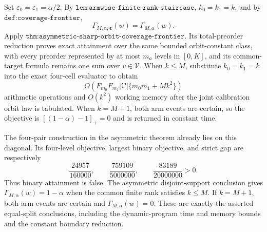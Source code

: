 Set \(\varepsilon_0=\varepsilon_1=\alpha/2\). By \(\texttt{lem:armwise-finite-rank-staircase}\), \(k_0=k_1=k\), and by \(\texttt{def:coverage-frontier}\),
\[
\Gamma_{M,\alpha,\boldsymbol\varepsilon}(w)=\Gamma_{M,\alpha}(w).
\]
Apply \(\texttt{thm:asymmetric-sharp-orbit-coverage-frontier}\). Its total-preorder reduction proves exact attainment over the same bounded orbit-constant class, with every preorder represented by at most \(m_a\) levels in \([0,K]\), and its common-target formula remains one sum over \(v\in\mathcal V\). When \(k\le M\), substitute \(k_0=k_1=k\) into the exact four-cell evaluator to obtain
\[
O\!\left(F_{m_0}F_{m_1}|\mathcal V|\{m_0m_1+Mk^2\}\right)
\]
arithmetic operations and \(O(k^2)\) working memory after the joint calibration orbit law is tabulated. When \(k=M+1\), both arm events are certain, so the objective is \([(1-\alpha)-1]_+=0\) and is returned in constant time.

The four-pair construction in the asymmetric theorem already lies on this diagonal. Its four-level objective, largest binary objective, and strict gap are respectively
\[
\frac{24957}{160000},\qquad \frac{759109}{5000000},\qquad \frac{83189}{20000000}>0.
\]
Thus binary attainment is false. The asymmetric disjoint-support conclusion gives \(\Gamma_{M,\alpha}(w)=1-\alpha\) when the common finite rank satisfies \(k\le M\). If \(k=M+1\), both arm events are certain and \(\Gamma_{M,\alpha}(w)=0\). These are exactly the asserted equal-split conclusions, including the dynamic-program time and memory bounds and the constant boundary reduction.